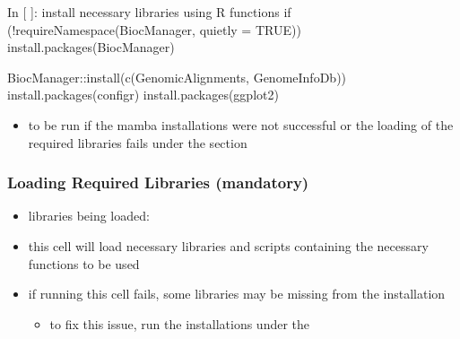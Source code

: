 \documentclass[letterpaper,10pt,english]{sphinxhowto}
\begin{document}
\begin{sphinxVerbatim}[commandchars=\\\{\}]
In [ ]: \PYGZsh{} install necessary libraries using R functions
        if (!requireNamespace(\PYGZdq{}BiocManager\PYGZdq{}, quietly = TRUE))
            install.packages(\PYGZdq{}BiocManager\PYGZdq{})

        BiocManager::install(c(\PYGZdq{}GenomicAlignments\PYGZdq{}, \PYGZdq{}GenomeInfoDb\PYGZdq{}))
        install.packages(\PYGZdq{}configr\PYGZdq{})
        install.packages(\PYGZdq{}ggplot2\PYGZdq{})
\end{sphinxVerbatim}
\begin{itemize}
\item {} 
\sphinxAtStartPar
to be run if the mamba installations were not successful or the loading of the required libraries fails under the  section

\end{itemize}


\subsubsection{Loading Required Libraries (mandatory)}
\label{\detokenize{index:loading-required-libraries-mandatory}}\begin{itemize}
\item {} 
\sphinxAtStartPar
libraries being loaded:

\end{itemize}

\begin{sphinxVerbatim}[commandchars=\\\{\}]
 \PYG{p}{[} \PYG{p}{]} 

\end{sphinxVerbatim}
\begin{itemize}
\item {} 
\sphinxAtStartPar
this cell will load necessary libraries and scripts containing the necessary functions to be used

\item {} 
\sphinxAtStartPar
if running this cell fails, some libraries may be missing from the installation
\begin{itemize}
\item {} 
\sphinxAtStartPar
to fix this issue, run the installations under the 

\end{itemize}

\end{itemize}
\end{document}
